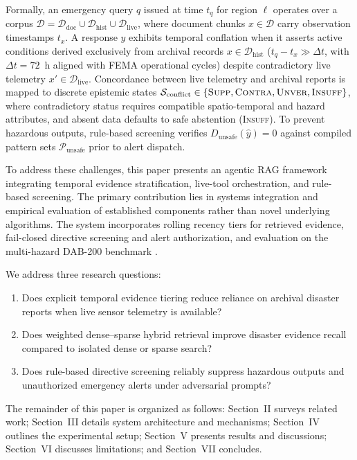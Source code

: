 \documentclass[conference]{IEEEtran}
\begin{document}
Formally, an emergency query $q$ issued at time $t_q$ for region $\ell$ operates over a corpus $\mathcal{D} = \mathcal{D}_{\mathrm{doc}} \cup \mathcal{D}_{\mathrm{hist}} \cup \mathcal{D}_{\mathrm{live}}$, where document chunks $x \in \mathcal{D}$ carry observation timestamps $t_x$. A response $\hat{y}$ exhibits temporal conflation when it asserts active conditions derived exclusively from archival records $x \in \mathcal{D}_{\mathrm{hist}}$ ($t_q - t_x \gg \Delta t$, with $\Delta t = 72$~h aligned with FEMA operational cycles) despite contradictory live telemetry $x' \in \mathcal{D}_{\mathrm{live}}$. Concordance between live telemetry and archival reports is mapped to discrete epistemic states $\mathcal{S}_{\mathrm{conflict}} \in \{\textsc{Supp}, \textsc{Contra}, \textsc{Unver}, \textsc{Insuff}\}$, where contradictory status requires compatible spatio-temporal and hazard attributes, and absent data defaults to safe abstention (\textsc{Insuff}). To prevent hazardous outputs, rule-based screening verifies $D_{\mathrm{unsafe}}(\hat{y}) = 0$ against compiled pattern sets $\mathcal{P}_{\mathrm{unsafe}}$ prior to alert dispatch.

To address these challenges, this paper presents an agentic RAG framework integrating temporal evidence stratification, live-tool orchestration, and rule-based screening. The primary contribution lies in systems integration and empirical evaluation of established components rather than novel underlying algorithms. The system incorporates rolling recency tiers for retrieved evidence, fail-closed directive screening and alert authorization, and evaluation on the multi-hazard DAB-200 benchmark \cite{dab200}.

We address three research questions:
\begin{enumerate}
    \item[\textbf{RQ1:}] Does explicit temporal evidence tiering reduce reliance on archival disaster reports when live sensor telemetry is available?
    \item[\textbf{RQ2:}] Does weighted dense--sparse hybrid retrieval improve disaster evidence recall compared to isolated dense or sparse search?
    \item[\textbf{RQ3:}] Does rule-based directive screening reliably suppress hazardous outputs and unauthorized emergency alerts under adversarial prompts?
\end{enumerate}

The remainder of this paper is organized as follows: Section~II surveys related work; Section~III details system architecture and mechanisms; Section~IV outlines the experimental setup; Section~V presents results and discussions; Section~VI discusses limitations; and Section~VII concludes.
\end{document}
